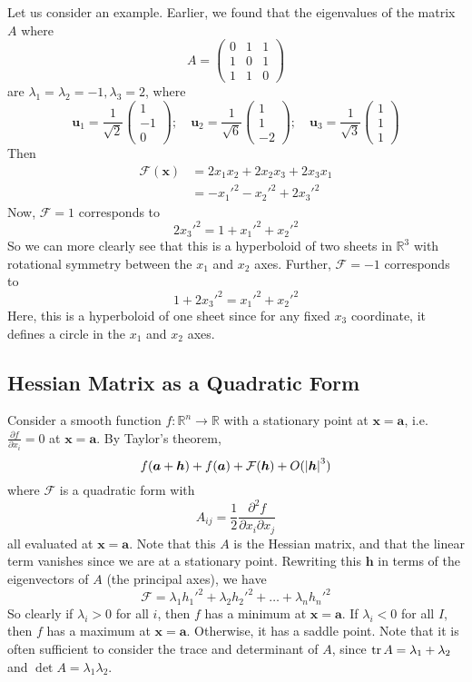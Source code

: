 \documentclass{article}
\begin{document}
	Let us consider an example. Earlier, we found that the eigenvalues of the matrix $A$ where
	\[ A = \begin{pmatrix}
		0 & 1 & 1 \\ 1 & 0 & 1 \\ 1 & 1 & 0
	\end{pmatrix} \]
	are $\lambda_1 = \lambda_2 = -1, \lambda_3 = 2$, where
	\[ \bm u_1 = \frac{1}{\sqrt 2} \begin{pmatrix}
		1 \\ -1 \\ 0
	\end{pmatrix};\quad \bm u_2 = \frac{1}{\sqrt 6}\begin{pmatrix}
		1 \\ 1 \\ -2
	\end{pmatrix};\quad \bm u_3 = \frac{1}{\sqrt 3}\begin{pmatrix}
		1 \\ 1 \\ 1
	\end{pmatrix} \]
	Then
	\begin{align*}
		\mathcal F(\bm x) &= 2x_1x_2 + 2x_2x_3 + 2x_3x_1 \\
		&= -x_1'^2 -x_2'^2 + 2x_3'^2
	\end{align*}
	Now, $\mathcal F = 1$ corresponds to
	\[ 2x_3'^2 = 1 + x_1'^2 + x_2'^2 \]
	So we can more clearly see that this is a hyperboloid of two sheets in $\mathbb R^3$ with rotational symmetry between the $x_1$ and $x_2$ axes. Further, $\mathcal F = -1$ corresponds to
	\[ 1 + 2x_3'^2 = x_1'^2 + x_2'^2 \]
	Here, this is a hyperboloid of one sheet since for any fixed $x_3$ coordinate, it defines a circle in the $x_1$ and $x_2$ axes.

	\subsection{Hessian Matrix as a Quadratic Form}
	Consider a smooth function $f\colon \mathbb R^n \to \mathbb R$ with a stationary point at $\bm x = \bm a$, i.e. $\frac{\partial f}{\partial x_i} = 0$ at $\bm x = \bm a$. By Taylor's theorem,
	\[ f(\bm a + \bm h) + f(\bm a) + \mathcal F(\bm h) + O(\abs{\bm h}^3) \]
	where $\mathcal F$ is a quadratic form with
	\[ A_{ij} = \frac{1}{2}\frac{\partial^2 f}{\partial x_i\partial x_j} \]
	all evaluated at $\bm x = \bm a$. Note that this $A$ is the Hessian matrix, and that the linear term vanishes since we are at a stationary point. Rewriting this $\bm h$ in terms of the eigenvectors of $A$ (the principal axes), we have
	\[ \mathcal F = \lambda_1 h_1'^2 + \lambda_2 h_2'^2 + \dots + \lambda_n h_n'^2 \]
	So clearly if $\lambda_i > 0$ for all $i$, then $f$ has a minimum at $\bm x = \bm a$. If $\lambda_i < 0$ for all $I$, then $f$ has a maximum at $\bm x = \bm a$. Otherwise, it has a saddle point. Note that it is often sufficient to consider the trace and determinant of $A$, since $\trace A = \lambda_1 + \lambda_2$ and $\det A = \lambda_1\lambda_2$.
\end{document}
